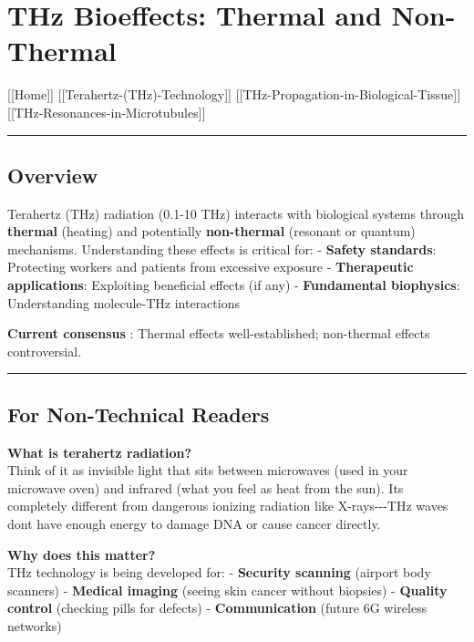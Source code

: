 \section{THz Bioeffects: Thermal and
Non-Thermal}\label{thz-bioeffects-thermal-and-non-thermal}

{[}{[}Home{]}{]} \textbar{} {[}{[}Terahertz-(THz)-Technology{]}{]}
\textbar{} {[}{[}THz-Propagation-in-Biological-Tissue{]}{]} \textbar{}
{[}{[}THz-Resonances-in-Microtubules{]}{]}

\begin{center}\rule{0.5\linewidth}{0.5pt}\end{center}

\subsection{Overview}\label{overview}

Terahertz (THz) radiation (0.1-10 THz) interacts with biological systems
through \textbf{thermal} (heating) and potentially \textbf{non-thermal}
(resonant or quantum) mechanisms. Understanding these effects is
critical for: - \textbf{Safety standards}: Protecting workers and
patients from excessive exposure - \textbf{Therapeutic applications}:
Exploiting beneficial effects (if any) - \textbf{Fundamental
biophysics}: Understanding molecule-THz interactions

\textbf{Current consensus} : Thermal effects well-established;
non-thermal effects controversial.

\begin{center}\rule{0.5\linewidth}{0.5pt}\end{center}

\subsection{\texorpdfstring{For Non-Technical Readers
}{For Non-Technical Readers }}\label{for-non-technical-readers}

\textbf{What is terahertz radiation?}\\
Think of it as invisible light that sits between microwaves (used in
your microwave oven) and infrared (what you feel as heat from the sun).
It\textquotesingle s completely different from dangerous ionizing
radiation like X-rays-\/-\/-THz waves don\textquotesingle t have enough
energy to damage DNA or cause cancer directly.

\textbf{Why does this matter?}\\
THz technology is being developed for: - \textbf{Security scanning}
(airport body scanners) - \textbf{Medical imaging} (seeing skin cancer
without biopsies) - \textbf{Quality control} (checking pills for
defects) - \textbf{Communication} (future 6G wireless networks)

